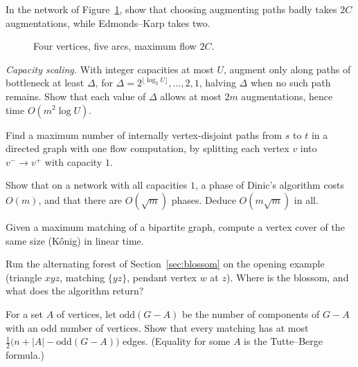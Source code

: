 \begin{exercise}[$\star$]\label{ex:ffbad}
In the network of Figure~\ref{fig:ffbad}, show that choosing augmenting paths badly takes $2C$ augmentations, while Edmonds--Karp takes two.
\end{exercise}

\begin{figure}[ht]
\centering
{}
\caption{Four vertices, five arcs, maximum flow $2C$.}
\label{fig:ffbad}
\end{figure}

\begin{exercise}[$\star\star$]\label{ex:scaling}
\emph{Capacity scaling.} With integer capacities at most $U$, augment only along paths of bottleneck at least $\Delta$, for $\Delta=2^{\lfloor\log_2U\rfloor},\dots,2,1$, halving $\Delta$ when no such path remains. Show that each value of $\Delta$ allows at most $2m$ augmentations, hence time
$O(m^2\log U)$.
\end{exercise}

\begin{exercise}[$\star$]\label{ex:vertexcap}
Find a maximum number of internally vertex-disjoint paths from $s$ to $t$ in a directed graph with one flow computation, by splitting each vertex $v$ into $v^-\to v^+$ with capacity $1$.
\end{exercise}

\begin{exercise}[$\star\star$]\label{ex:dinicunit}
Show that on a network with all capacities $1$, a phase of Dinic's algorithm costs $O(m)$, and that there are $O(\sqrt m)$ phases. Deduce $O(m\sqrt m)$ in all.
\end{exercise}

\begin{exercise}[$\star$]\label{ex:konigcover}
Given a maximum matching of a bipartite graph, compute a vertex cover of the same size (K\H onig) in linear time.
\end{exercise}

\begin{exercise}[$\star$]\label{ex:whyblossom}
Run the alternating forest of Section~\ref{sec:blossom} on the opening example (triangle $xyz$, matching $\{yz\}$, pendant vertex $w$ at $z$). Where is the blossom, and what does the algorithm return?
\end{exercise}

\begin{exercise}[$\star$]\label{ex:tutteberge}
For a set $A$ of vertices, let $\mathrm{odd}(G-A)$ be the number of components of $G-A$ with an odd number of vertices. Show that every matching has at most $\frac12\big(n+|A|-\mathrm{odd}(G-A)\big)$ edges. (Equality for some $A$ is the Tutte--Berge formula.)
\end{exercise}

